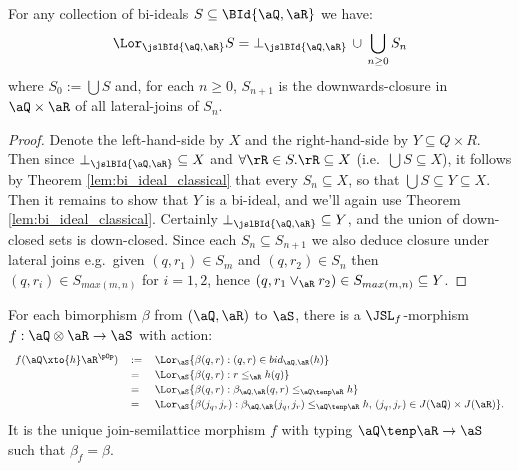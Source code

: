 \documentclass{article}
\begin{document}
\begin{corollary}
\label{cor:bi_ideal_jsl_join}
For any collection of bi-ideals $S \subseteq \BId{\aQ,\aR}$ we have:
\[
\Lor_{\jslBId{\aQ,\aR}} S = \bot_{\jslBId{\aQ,\aR}} \,\cup\, \bigcup_{n \geq 0} S_n
\]
where $S_0 := \bigcup S$ and, for each $n \geq 0$, $S_{n+1}$ is the downwards-closure in $\aQ \times \aR$ of all lateral-joins of $S_n$.
\end{corollary}

\begin{proof}
Denote the left-hand-side by $X$ and the right-hand-side by $Y \subseteq Q \times R$. Then since $\bot_{\jslBId{\aQ,\aR}} \subseteq X$ and $\forall \rR \in S. \rR \subseteq X$ (i.e.\ $\bigcup S \subseteq X$), it follows by Theorem \ref{lem:bi_ideal_classical} that every $S_n \subseteq X$, so that $\bigcup S \subseteq Y \subseteq X$. Then it remains to show that $Y$ is a bi-ideal, and we'll again use Theorem \ref{lem:bi_ideal_classical}. Certainly $\bot_{\jslBId{\aQ,\aR}} \subseteq Y$, and the union of  down-closed sets is down-closed. Since each $S_n \subseteq S_{n+1}$ we also deduce closure under lateral joins e.g.\ given $(q,r_1) \in S_m$ and $(q,r_2) \in S_n$ then $(q,r_i) \in S_{max(m,n)}$ for $i = 1,2$, hence $(q,r_1 \lor_\aR r_2) \in S_{max(m,n)} \subseteq Y$.
\end{proof}




\begin{theorem}
\label{thm:tenp_universal}
\item
For each bimorphism $\beta$ from $(\aQ,\aR)$ to $\aS$, there is a $\JSL_f$-morphism $f : \aQ \otimes \aR \to \aS$ with action:
\[
\begin{tabular}{lll}
$f(\aQ \xto{h} \aR^{\pOp})$
&
$:=$
&
$\Lor_\aS \{ \beta(q,r) : (q,r) \in bid_{\aQ,\aR}(h) \}$
\\[0.5ex] &=&
$\Lor_\aS \{ \beta(q,r) : r \leq_\aR h(q)\}$
\\[0.5ex] &=&
$\Lor_\aS \{ \beta(q,r) : \beta_{\aQ,\aR}(q,r) \leq_{\aQ \tenp \aR} h \}$
\\[0.5ex] &=&
$\Lor_\aS \{ \beta(j_q,j_r) : \beta_{\aQ,\aR}(j_q,j_r) \leq_{\aQ \tenp \aR} h, \, (j_q,j_r) \in J(\aQ) \times J(\aR) \}$.
\end{tabular}
\]
It is the unique join-semilattice morphism $f$ with typing $\aQ \tenp \aR \to \aS$ such that $\beta_f = \beta$.
\end{theorem}

\end{document}
